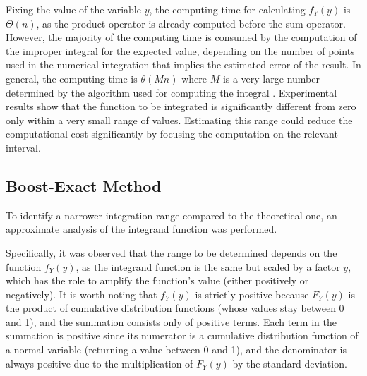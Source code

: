 Fixing the value of the variable $y$, the computing time for calculating $f_Y(y)$ is $\Theta(n)$, as the product operator is already computed before the sum operator. However, the majority of the computing time is consumed by the computation of the improper integral for the expected value, depending on the number of points used in the numerical integration that implies the estimated error of the result. In general, the computing time is $\theta(M n)$ where $M$ is a very large number determined by the algorithm used for computing the integral \cite{2020SciPy-NMeth}.
Experimental results show that the function to be integrated is significantly different from zero only within a very small range of values. Estimating this range could reduce the computational cost significantly by focusing the computation on the relevant interval.

\subsection{Boost-Exact Method}
To identify a narrower integration range compared to the theoretical one, an approximate analysis of the integrand function was performed.

Specifically, it was observed that the range to be determined depends on the function \( f_Y(y) \), as the integrand function is the same but scaled by a factor \( y \), which has the role to amplify the function's value (either positively or negatively). It is worth noting that \( f_Y(y) \) is strictly positive because \( F_Y(y) \) is the product of cumulative distribution functions (whose values stay between 0 and 1), and the summation consists only of positive terms. Each term in the summation is positive since its numerator is a cumulative distribution function of a normal variable (returning a value between 0 and 1), and the denominator is always positive due to the multiplication of \( F_Y(y) \) by the standard deviation.

